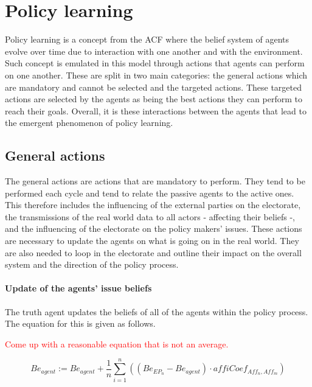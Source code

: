 \documentclass[11pt]{article}
\begin{document}
\section{Policy learning}
\label{sec:policyLearning}
Policy learning is a concept from the ACF where the belief system of agents evolve over time due to interaction with one another and with the environment. Such concept is emulated in this model through actions that agents can perform on one another. These are split in two main categories: the general actions which are mandatory and cannot be selected and the targeted actions. These targeted actions are selected by the agents as being the best actions they can perform to reach their goals. Overall, it is these interactions between the agents that lead to the emergent phenomenon of policy learning.

\subsection{General actions}
\label{ssec:}

The general actions are actions that are mandatory to perform. They tend to be performed each cycle and tend to relate the passive agents to the active ones. This therefore includes the influencing of the external parties on the electorate, the transmissions of the real world data to all actors - affecting their beliefs -, and the influencing of the electorate on the policy makers' issues. These actions are necessary to update the agents on what is going on in the real world. They are also needed to loop in the electorate and outline their impact on the overall system and the direction of the policy process.

\paragraph{Update of the agents' issue beliefs}
\label{sssec:actionEPs}

The truth agent updates the beliefs of all of the agents within the policy process. The equation for this is given as follows.

\textcolor{red}{Come up with a reasonable equation that is not an average.}

\begin{equation}
Be_{agent} := Be_{agent} + \frac{1}{n} \sum_{i=1}^n \left( \left(Be_{EP_n} - Be_{agent} \right) \cdot affiCoef_{Aff_n,Aff_m} \right)
\end{equation}
\end{document}
